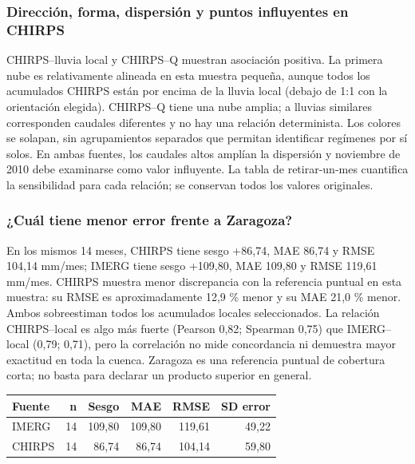 \documentclass[10pt,a4paper]{article}
\begin{document}
\subsubsection*{Dirección, forma, dispersión y puntos influyentes en CHIRPS}
CHIRPS--lluvia local y CHIRPS--Q muestran asociación positiva. La primera nube es relativamente alineada en esta muestra pequeña, aunque todos los acumulados CHIRPS están por encima de la lluvia local (debajo de 1:1 con la orientación elegida). CHIRPS--Q tiene una nube amplia; a lluvias similares corresponden caudales diferentes y no hay una relación determinista. Los colores se solapan, sin agrupamientos separados que permitan identificar regímenes por sí solos. En ambas fuentes, los caudales altos amplían la dispersión y noviembre de 2010 debe examinarse como valor influyente. La tabla de retirar-un-mes cuantifica la sensibilidad para cada relación; se conservan todos los valores originales.
\subsubsection*{¿Cuál tiene menor error frente a Zaragoza?}
En los mismos 14 meses, CHIRPS tiene sesgo +86,74, MAE 86,74 y RMSE 104,14 mm/mes; IMERG tiene sesgo +109,80, MAE 109,80 y RMSE 119,61 mm/mes. CHIRPS muestra menor discrepancia con la referencia puntual en esta muestra: su RMSE es aproximadamente 12,9 \% menor y su MAE 21,0 \% menor. Ambos sobreestiman todos los acumulados locales seleccionados. La relación CHIRPS--local es algo más fuerte (Pearson 0,82; Spearman 0,75) que IMERG--local (0,79; 0,71), pero la correlación no mide concordancia ni demuestra mayor exactitud en toda la cuenca. Zaragoza es una referencia puntual de cobertura corta; no basta para declarar un producto superior en general.
\begin{center}\small\begin{tabular}{lrrrrr}\hline
Fuente & n & Sesgo & MAE & RMSE & SD error \\ \hline
IMERG & 14 & 109,80 & 109,80 & 119,61 & 49,22 \\
CHIRPS & 14 & 86,74 & 86,74 & 104,14 & 59,80 \\
\hline\end{tabular}\end{center}
\end{document}
